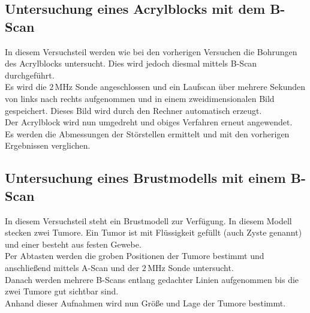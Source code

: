 \subsection{Untersuchung eines Acrylblocks mit dem B-Scan}

In diesem Versuchsteil werden wie bei den vorherigen Versuchen
die Bohrungen des Acrylblocks untersucht. Dies wird jedoch
diesmal mittels B-Scan durchgeführt.\\
Es wird die $2 \, \si{\mega\hertz}$ Sonde angeschlossen und ein
Laufscan über mehrere Sekunden von links nach rechts aufgenommen 
und in einem zweidimensionalen Bild gespeichert. Dieses Bild wird 
durch den Rechner automatisch erzeugt.\\
Der Acrylblock wird nun umgedreht und obiges Verfahren erneut
angewendet.\\
Es werden die Abmessungen der Störstellen ermittelt und mit den
vorherigen Ergebnissen verglichen.\\

\subsection{Untersuchung eines Brustmodells mit einem B-Scan}

In diesem Versuchsteil steht ein Brustmodell zur Verfügung.
In diesem Modell stecken zwei Tumore. Ein Tumor ist mit Flüssigkeit gefüllt (auch Zyste genannt)
und einer besteht aus festen Gewebe.\\
Per Abtasten werden die groben Positionen der Tumore bestimmt und 
anschließend mittels A-Scan und der $2 \, \si{\mega\hertz}$ Sonde
untersucht.\\
Danach werden mehrere B-Scans entlang gedachter Linien
aufgenommen bis die zwei Tumore gut sichtbar sind.\\
Anhand dieser Aufnahmen wird nun Größe und Lage der Tumore bestimmt.\\